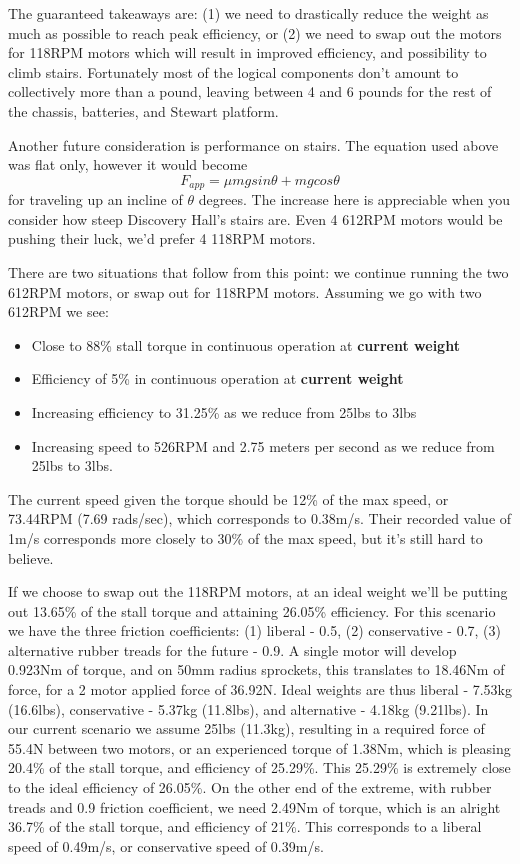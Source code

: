 \documentclass[a4paper, 10pt]{article}
\begin{document}
		The guaranteed takeaways are: (1) we need to drastically reduce the weight as much as possible to reach peak efficiency, or (2) we need to swap out the motors for 118RPM motors which will result in improved efficiency, and possibility to climb stairs. Fortunately most of the logical components don't amount to collectively more than a pound, leaving between 4 and 6 pounds for the rest of the chassis, batteries, and Stewart platform. 
	
		Another future consideration is performance on stairs. The equation used above was flat only, however it would become 
		$$F_{app} = \mu mgsin\theta + mgcos\theta$$
		for traveling up an incline of $\theta$ degrees. The increase here is appreciable when you consider how steep Discovery Hall's stairs are. Even 4 612RPM motors would be pushing their luck, we'd prefer 4 118RPM motors. 
		
		There are two situations that follow from this point: we continue running the two 612RPM motors, or swap out for 118RPM motors. Assuming we go with two 612RPM we see:
		\begin{itemize}
			\item Close to 88\% stall torque in continuous operation at \textbf{current weight}
			\item Efficiency of 5\% in continuous operation at \textbf{current weight}
			\item Increasing efficiency to 31.25\% as we reduce from 25lbs to 3lbs
			\item Increasing speed to 526RPM and 2.75 meters per second as we reduce from 25lbs to 3lbs.
		\end{itemize}
		The current speed given the torque should be 12\% of the max speed, or 73.44RPM (7.69 rads/sec), which corresponds to 0.38m/s. Their recorded value of 1m/s corresponds more closely to 30\% of the max speed, but it's still hard to believe.
		
		If we choose to swap out the 118RPM motors, at an ideal weight we'll be putting out 13.65\% of the stall torque and attaining 26.05\% efficiency. For this scenario we have the three friction coefficients: (1) liberal - 0.5, (2) conservative - 0.7, (3) alternative rubber treads for the future - 0.9. A single motor will develop 0.923Nm of torque, and on 50mm radius sprockets, this translates to 18.46Nm of force, for a 2 motor applied force of 36.92N. Ideal weights are thus liberal - 7.53kg (16.6lbs), conservative - 5.37kg (11.8lbs), and alternative - 4.18kg (9.21lbs). In our current scenario we assume 25lbs (11.3kg), resulting in a required force of 55.4N between two motors, or an experienced torque of 1.38Nm, which is pleasing 20.4\% of the stall torque, and efficiency of 25.29\%. This 25.29\% is extremely close to the ideal efficiency of 26.05\%. On the other end of the extreme, with rubber treads and 0.9 friction coefficient,  we need 2.49Nm of torque, which is an alright 36.7\% of the stall torque, and efficiency of 21\%. This corresponds to a liberal speed of 0.49m/s, or conservative speed of 0.39m/s. 
		
\end{document}
